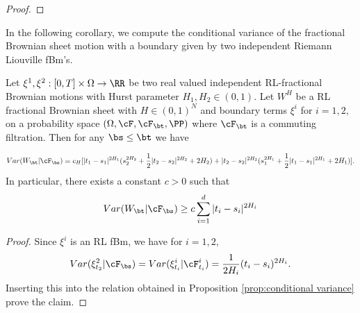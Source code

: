 \begin{proof}
\end{proof}

In the following corollary, we compute the conditional variance of the fractional Brownian sheet motion with a boundary given by two independent Riemann Liouville fBm's.  



\begin{cor}
Let $\xi^1,\xi^2:[0,T]\times \Omega \rightarrow \RR$ be two real valued independent RL-fractional Brownian motions with Hurst parameter $H_1,H_2\in(0,1)$. Let $W^H$ be a RL fractional Brownian sheet with $H\in (0,1)^N$ and boundary terms $\xi^i$ for $i=1,2,$ on a probability space $(\Omega, \cF,\cF_{\bt},\PP)$ where $\cF_\bt$ is a commuting filtration. Then for any $\bs\leq \bt$ we have 

\begin{equation*}
    Var(W_\bt|\cF_\bs) = c_H[|t_1-s_1|^{2H_1}(s_2^{2H_2}+\frac{1}{2}|t_2-s_2|^{2H_2}+ 2H_2)+|t_2-s_2|^{2H_2}(s_1^{2H_1}+\frac{1}{2}|t_1-s_1|^{2H_1}+ 2H_1)].
\end{equation*}
In particular, there exists a constant $c>0$ such that 
\[
Var(W_\bt|\cF_\bs) \geq c\sum_{i=1}^d |t_i-s_i|^{2H_i}
\]
\end{cor}

\begin{proof}
    Since $\xi^i$ is an RL fBm, we have for $i=1,2,$
    \begin{equation}
        Var(\xi^2_{t_2}|\cF_\bs)=Var(\xi^i_{t_i}|\cF^i_{t_i})=\frac{1}{2H_i}(t_i-s_i)^{2H_i}. 
    \end{equation}
    Inserting this into the relation obtained in Proposition \ref{prop:conditional variance} prove the claim. 
\end{proof}